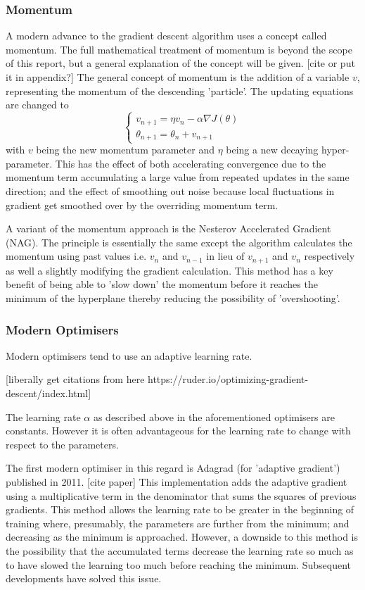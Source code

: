 \documentclass[a4paper,fleqn,usenatbib]{mnras}
\begin{document}
\subsubsection{Momentum}
A modern advance to the gradient descent algorithm uses a concept called momentum. The full mathematical treatment of momentum is beyond the scope of this report, but a general explanation of the concept will be given. [cite or put it in appendix?] The general concept of momentum is the addition of a variable $v$, representing the momentum of the descending 'particle'. The updating equations are changed to 
\begin{equation}
\begin{cases} v_{n+1}=\eta v_{n}-\alpha\nabla J(\theta)  \\ \theta_{n+1}=\theta_{n}+v_{n+1}\end{cases}
\end{equation}
with $v$ being the new momentum parameter and $\eta$ being a new decaying hyper-parameter. This has the effect of both accelerating convergence due to the momentum term accumulating a large value from repeated updates in the same direction; and the effect of smoothing out noise because local fluctuations in gradient get smoothed over by the overriding momentum term.

A variant of the momentum approach is the Nesterov Accelerated Gradient (NAG). The principle is essentially the same except the algorithm calculates the momentum using past values i.e. $v_{n}$ and $v_{n-1}$ in lieu of $v_{n+1}$ and $v_{n}$ respectively as well a slightly modifying the gradient calculation. This method has a key benefit of being able to 'slow down' the momentum before it reaches the minimum of the hyperplane thereby reducing the possibility of 'overshooting'.

\subsubsection{Modern Optimisers}
\label{section:modern optimizers}
Modern optimisers tend to use an adaptive learning rate.

[liberally get citations from here https://ruder.io/optimizing-gradient-descent/index.html]

 The learning rate $\alpha$ as described above in the aforementioned optimisers are constants. However it is often advantageous for the learning rate to change with respect to the parameters.
 
 The first modern optimiser in this regard is Adagrad (for 'adaptive gradient') published in 2011. [cite paper] This implementation adds the adaptive gradient using a multiplicative term in the denominator that sums the squares of previous gradients. This method allows the learning rate to be greater in the beginning of training where, presumably, the parameters are further from the minimum; and decreasing as the minimum is approached. However, a downside to this method is the possibility that the accumulated terms decrease the learning rate so much as to have slowed the learning too much before reaching the minimum. Subsequent developments have solved this issue. 
 
\end{document}
